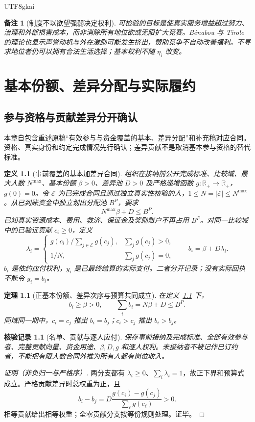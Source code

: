 \documentclass[12pt,a4paper,openany]{report}
\newtheorem{definition}{定义}[chapter]
\newtheorem{theorem}{定理}[chapter]
\newtheorem{remark}{备注}[chapter]
\newtheorem{Certificate}{核验记录}[chapter]
\newcommand{\RR}{\mathbb R}
\begin{document}
\begin{CJK*}{UTF8}{gkai}
\begin{remark}[制度不以欲望强弱决定权利]
可检验的目标是使真实服务增益超过努力、治理和外部损害成本，而非消除所有地位欲或无限扩大竞赛。B\'enabou 与 Tirole 的理论也显示声誉动机与外在激励可能发生挤出，赞助竞争不自动改善福利\cite{Benabou2006}。不寻求地位者仍可以拥有合法生活选择；基本权利不随 $\eta_i$ 改变。
\end{remark}
\chapter{基本份额、差异分配与实际履约}
\label{chap:distribution}
\section{参与资格与贡献差异分开确认}
本章自包含重述原稿“有效参与与资金覆盖的基本、差异分配”和补充稿对应合同\cite{SourceMarket,SourceSupplement}。资格、真实身份和约定完成情况先行确认；差异贡献不是取消基本参与资格的替代标准。

\begin{definition}[事前覆盖的基本加差异合同]
\label{def:distribution}
组织在接纳前公开完成标准、比较域、最大人数 $N^{\max}$、基本份额 $\beta>0$、差异池 $D>0$ 及严格递增函数 $g:\RR_+\to\RR_+$，$g(0)=0$。令 $\mathcal E$ 为已完成合同且通过独立真实性核验的人，$1\le N=|\mathcal E|\le N^{\max}$。从已到账资金中独立划出分配池 $B^P$，要求
\[
 N^{\max}\beta+D\le B^P.
\]
已知真实资源成本、费用、救济、保证金及奖励账户不再占用 $B^P$。对同一比较域中的已验证贡献 $c_i\ge0$，定义
\[
 \lambda_i=\begin{cases}
 g(c_i)/\sum_{j\in\mathcal E}g(c_j),&\sum_jg(c_j)>0,\\
 1/N,&\sum_jg(c_j)=0,
 \end{cases}
 \qquad b_i=\beta+D\lambda_i.
\]
$b_i$ 是依约应付权利，$y_i$ 是已最终结算的实际支付。二者分开记录；没有实际回执不能令 $y_i=b_i$。
\end{definition}

\begin{theorem}[正基本份额、差异次序与预算共同成立]
\label{thm:distribution}
在定义~\ref{def:distribution} 下，
\[
 b_i\ge\beta>0,\qquad
 \sum_i b_i=N\beta+D\le B^P.
\]
同域同一期中，$c_i=c_j$ 推出 $b_i=b_j$；$c_i>c_j$ 推出 $b_i>b_j$。
\end{theorem}
\begin{Certificate}[名单、贡献与逐人应付]
保存事前接纳及完成标准、全部有效参与者、完整贡献向量、资金用途、$\beta,D,g$ 和逐人权利。未接纳者不被记作已订约者，不能把有限人数合同外推为所有人都有岗位收入。
\end{Certificate}
\begin{proof}[证明（非负归一与严格序）]
两分支都有 $\lambda_i\ge0$、$\sum_i\lambda_i=1$，故正下界和预算式成立。严格贡献差异时总权重为正，且
\[
 b_i-b_j=D\frac{g(c_i)-g(c_j)}{\sum_\ell g(c_\ell)}>0.
\]
相等贡献给出相等权重；全零贡献分支按等份规则处理。证毕。
\end{proof}


\end{CJK*}
\end{document}
